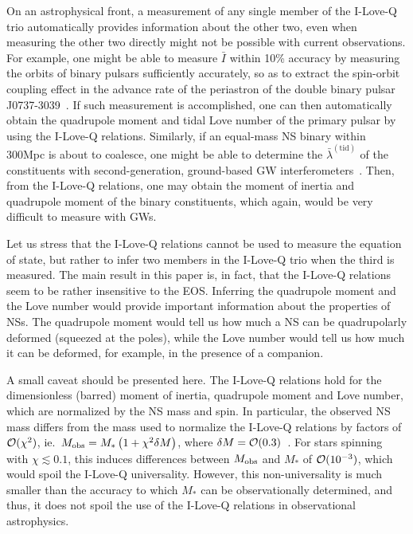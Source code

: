 \documentclass[aps,twocolumn,nofootinbib,showpacs,superscriptaddress,hyperref]{revtex4-1}
\newcommand{\lambdabartid}{\bar{\lambda}^\mathrm{(tid)}}
\newcommand{\Ibar}{\bar{I}}
\begin{document}
On an astrophysical front, a measurement of any single member of the I-Love-Q trio automatically provides information about the other two, even when measuring the other two directly might not be possible with current observations. For example, one might be able to measure $\Ibar$ within 10\% accuracy by measuring the orbits of binary pulsars sufficiently accurately, so as to extract the spin-orbit coupling effect in the advance rate of the periastron of the double binary pulsar J0737-3039~\cite{lattimer-schutz,kramer-wex}. If such measurement is accomplished, one can then automatically obtain the quadrupole moment and tidal Love number of the primary pulsar by using the I-Love-Q relations. Similarly, if an equal-mass NS binary within 300Mpc is about to coalesce, one might be able to determine the $\lambdabartid$ of the constituents with second-generation, ground-based GW interferometers~\cite{flanagan-hinderer-love,read-love,hinderer-lackey-lang-read,lackey,damour-nagar-villain}. Then, from the I-Love-Q relations, one may obtain the moment of inertia and quadrupole moment of the binary constituents, which again, would be very difficult to measure with GWs.  

Let us stress that the I-Love-Q relations cannot be used to measure the equation of state, but rather to infer two members in the I-Love-Q trio when the third is measured. The main result in this paper is, in fact, that the I-Love-Q relations seem to be rather insensitive to the EOS. Inferring the quadrupole moment and the Love number would provide important information about the properties of NSs. The quadrupole moment would tell us how much a NS can be quadrupolarly deformed (squeezed at the poles), while the Love number would tell us how much it can be deformed, for example, in the presence of a companion. 

A small caveat should be presented here. The I-Love-Q relations hold for the dimensionless (barred) moment of inertia, quadrupole moment and Love number, which are normalized by the NS mass and spin. In particular, the observed NS mass differs from the mass used to normalize the I-Love-Q relations by factors of ${\cal{O}}(\chi^{2})$, ie.~$M_{\rm obs} =  M_{*} \left(1 + \chi^{2} \delta M\right)$, where $\delta M = {\cal{O}}(0.3)$~\cite{Berti:2004ny,berti-iyer-will}. For stars spinning with $\chi \lesssim 0.1$, this induces differences between $M_{\rm obs}$ and $M_{*}$ of ${\cal{O}}(10^{-3})$, which would spoil the I-Love-Q universality. However, this non-universality is much smaller than the accuracy to which $M_{*}$ can be observationally determined, and thus, it does not spoil the use of the I-Love-Q relations in observational astrophysics.  
\end{document}
